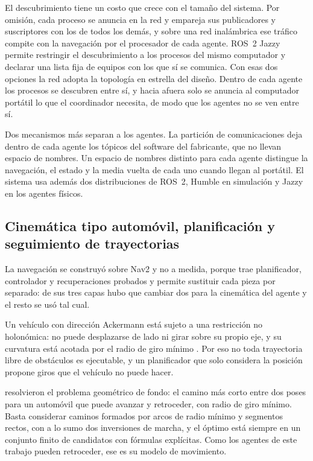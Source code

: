 El descubrimiento tiene un costo que crece con el tamaño del sistema. Por
omisión, cada proceso se anuncia en la red y empareja sus publicadores y
suscriptores con los de todos los demás, y sobre una red inalámbrica ese tráfico
compite con la navegación por el procesador de cada agente. ROS~2 Jazzy permite restringir el
descubrimiento a los procesos del mismo computador y declarar una lista fija de
equipos con los que sí se comunica. Con esas dos opciones la red adopta la
topología en estrella del diseño. Dentro de cada agente los procesos se
descubren entre sí, y hacia afuera solo se anuncia al computador portátil lo que
el coordinador necesita, de modo que los agentes no se ven entre sí.

Dos mecanismos más separan a los agentes. La partición de comunicaciones deja
dentro de cada agente los tópicos del software del fabricante, que no llevan
espacio de nombres. Un espacio de nombres distinto para cada agente distingue la navegación, el estado y la media vuelta de cada uno cuando llegan al portátil. El sistema usa además dos distribuciones de ROS~2, Humble en simulación y Jazzy en los agentes físicos.

\subsection{Cinemática tipo automóvil, planificación y seguimiento de trayectorias}
\label{sec:teo-planificacion}

La navegación se construyó sobre Nav2 \autocite{macenski2020marathon} y no a
medida, porque trae planificador, controlador y recuperaciones probados y permite
sustituir cada pieza por separado: de sus tres capas hubo que cambiar dos para la
cinemática del agente y el resto se usó tal cual.

Un vehículo con dirección Ackermann está sujeto a una restricción no holonómica:
no puede desplazarse de lado ni girar sobre su propio eje, y su curvatura está
acotada por el radio de giro mínimo \autocite{siegwart2011introduction}. Por eso
no toda trayectoria libre de obstáculos es ejecutable, y un planificador que solo
considera la posición propone giros que el vehículo no puede hacer.

\textcite{reeds1990optimal} resolvieron el problema geométrico de fondo: el
camino más corto entre dos poses para un automóvil que puede avanzar y
retroceder, con radio de giro mínimo. Basta considerar caminos formados por arcos
de radio mínimo y segmentos rectos, con a lo sumo dos inversiones de marcha, y el
óptimo está siempre en un conjunto finito de candidatos con fórmulas explícitas.
Como los agentes de este trabajo pueden retroceder, ese es su modelo de movimiento.

